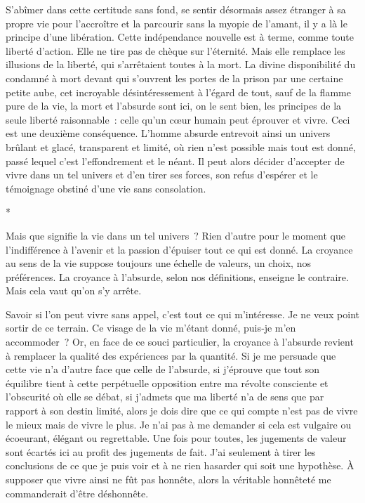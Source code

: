 \documentclass{book}
\begin{document}
S'abîmer dans cette certitude sans fond, se sentir désormais assez étranger à sa propre vie pour l'accroître et la parcourir sans la myopie de l'amant, il y a là le principe d'une libération. Cette indépendance nouvelle est à terme, comme toute liberté d'action. Elle ne tire pas de chèque sur l'éternité. Mais elle remplace les illusions de la liberté, qui s'arrêtaient toutes à la mort. La divine disponibilité du condamné à mort devant qui s'ouvrent les portes de la prison par une certaine petite aube, cet incroyable désintéressement à l'égard de tout, sauf de la flamme pure de la vie, la mort et l'absurde sont ici, on le sent bien, les principes de la seule liberté raisonnable : celle qu'un cœur humain peut éprouver et vivre. Ceci est une deuxième conséquence. L'homme absurde entrevoit ainsi un univers brûlant et glacé, transparent et limité, où rien n'est possible mais tout est donné, passé lequel c'est l'effondrement et le néant. Il peut alors décider d'accepter de vivre dans un tel univers et d'en tirer ses forces, son refus d'espérer et le témoignage obstiné d'une vie sans consolation.

\begin{center}
*
\end{center}

Mais que signifie la vie dans un tel univers ? Rien d'autre pour le moment que l'indifférence à l'avenir et la passion d'épuiser tout ce qui est donné. La croyance au sens de la vie suppose toujours une échelle de valeurs, un choix, nos préférences. La croyance à l'absurde, selon nos définitions, enseigne le contraire. Mais cela vaut qu'on s'y arrête.

Savoir si l'on peut vivre sans appel, c'est tout ce qui m'intéresse. Je ne veux point sortir de ce terrain. Ce visage de la vie m'étant donné, puis‑je m'en accommoder ? Or, en face de ce souci particulier, la croyance à l'absurde revient à remplacer la qualité des expériences par la quantité. Si je me persuade que cette vie n'a d'autre face que celle de l'absurde, si j'éprouve que tout son équilibre tient à cette perpétuelle opposition entre ma révolte consciente et l'obscurité où elle se débat, si j'admets que ma liberté n'a de sens que par rapport à son destin limité, alors je dois dire que ce qui compte n'est pas de vivre le mieux mais de vivre le plus. Je n'ai pas à me demander si cela est vulgaire ou écoeurant, élégant ou regrettable. Une fois pour toutes, les jugements de valeur sont écartés ici au profit des jugements de fait. J'ai seulement à tirer les conclusions de ce que je puis voir et à ne rien hasarder qui soit une hypothèse. À supposer que vivre ainsi ne fût pas honnête, alors la véritable honnêteté me commanderait d'être déshonnête.
\end{document}
